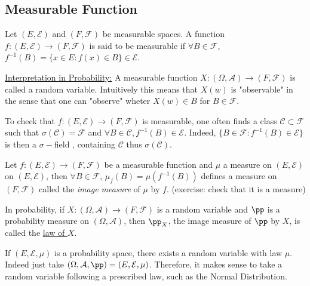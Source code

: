 \documentclass[../main.tex]{subfiles}
\begin{document}
  \subsection{Measurable Function}
  \begin{definition}
    Let $(E, \mathcal{E})$ and $(F, \mathcal{F})$ be measurable spaces. A function $f: (E,
    \mathcal{E}) \to (F, \mathcal{F})$ is said to be measurable if $\forall B \in \mathcal{F}$,
    $f^{-1}(B) = \{ x \in E \colon f(x) \in B \} \in \mathcal{E} $.
  \end{definition}

  \underline{Interpretation in Probability:} A measurable function $X: (\Omega, \mathcal{A})
  \to (F, \mathcal{F})$ is called a random variable. Intuitively this means that $X(w)$ is
  "observable" in the sense that one can "observe" wheter $X(w) \in B$ for $B \in \mathcal{F}$.

  \begin{proposition}
      To check that $f: (E, \mathcal{E}) \to (F, \mathcal{F})$ is measurable, one often finds a
      class $\mathcal{C} \subset \mathcal{F}$ such that $\sigma(\mathcal{C}) = \mathcal{F}$ and
      $\forall B \in \mathcal{C}, f^{-1}(B) \in \mathcal{E}$. Indeed,
      $\{ B \in \mathcal{F} \colon f^{-1}(B) \in \mathcal{E} \} $ is then a $\sigma-$field
      , containing $\mathcal{C}$ thus $\sigma(\mathcal{C})$.
  \end{proposition}

  \begin{definition}
    Let $f: (E, \mathcal{E}) \to (F, \mathcal{F})$ be a measurable function and $\mu$ a measure
    on $(E, \mathcal{E})$
  on $(E, \mathcal{E})$, then $\forall B \in \mathcal{F}$, $\mu_f(B) = \mu(f^{-1}(B))$ defines
  a measure on $(F, \mathcal{F})$ called the \textit{image measure} of $\mu$ by $f$. (exercise:
  check that it is a measure) 
  \end{definition}

  In probability, if $X: (\Omega,  \mathcal{A}) \to (F, \mathcal{F})$ is a random variable and
  $\pp$ is a probability measure on $(\Omega, \mathcal{A})$, then $\pp_X$, the image measure of
  $\pp$ by $X$, is called the \underline{law of $X$}.

  \begin{remark}
      If $(E, \mathcal{E}, \mu)$ is a probability space, there exists a random variable with
      law $\mu$. Indeed just take $(\Omega, \mathcal{A}, \pp) = (E, \mathcal{E}, \mu)$.
      Therefore, it makes sense to take a random variable following a prescribed law, such as
      the Normal Distribution.
  \end{remark}
\end{document}
